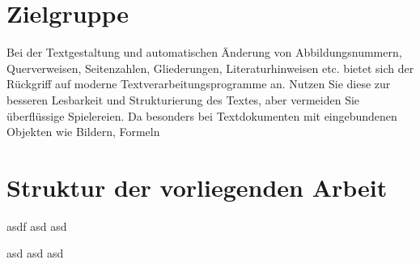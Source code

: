 \section{Zielgruppe}
Bei der Textgestaltung und automatischen Änderung von Abbildungsnummern, Querverweisen,
Seitenzahlen, Gliederungen, Literaturhinweisen etc. bietet sich der Rückgriff
auf moderne Textverarbeitungsprogramme an. Nutzen Sie diese zur besseren Lesbarkeit
und Strukturierung des Textes, aber vermeiden Sie überflüssige Spielereien. Da
besonders bei Textdokumenten mit eingebundenen Objekten wie Bildern, Formeln

\section{Struktur der vorliegenden Arbeit}
asdf
asd
asd

asd
asd
asd
